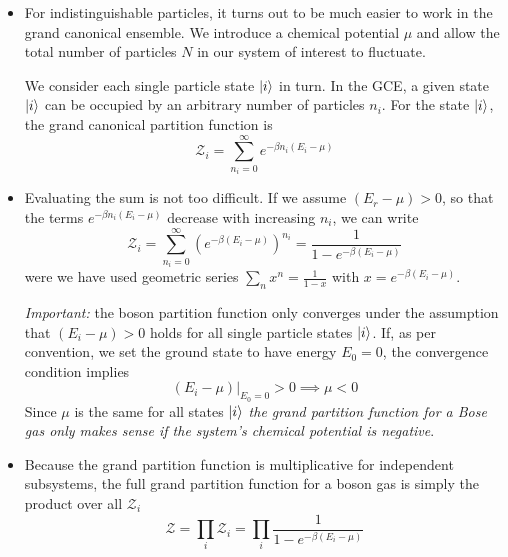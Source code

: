 \documentclass[11pt, a4paper]{article}
\begin{document}
\begin{itemize}
	\item For indistinguishable particles, it turns out to be much easier to work in the grand canonical ensemble. We introduce a chemical potential $ \mu $ and allow the total number of particles $ N $ in our system of interest to fluctuate.  
	
	We consider each single particle state $ \ket{i} $ in turn. In the GCE, a given state $ \ket{i} $ can be occupied by an arbitrary number of particles $ n_{i} $. For the state $ \ket{i} $, the grand canonical partition function is
	\begin{equation*}
		\mathcal{Z}_{i} = \sum_{n_{i}=0}^{\infty} e^{-\beta n_{i}(E_{i} - \mu)}
	\end{equation*}
	
	\item Evaluating the sum is not too difficult. If we assume $ (E_{r} - \mu) > 0 $, so that the terms $ e^{-\beta n_{i}(E_{i} - \mu)} $ decrease with increasing $ n_{i} $, we can write
	\begin{equation*}
		\mathcal{Z}_{i} = \sum_{n_{i}=0}^{\infty} \left(e^{-\beta (E_{i} - \mu)}\right)^{n_{i}} = \frac{1}{1 - e^{-\beta (E_{i} - \mu)}}
	\end{equation*}
	were we have used geometric series $ \sum_{n} x^{n} = \frac{1}{1 - x} $ with $ x = e^{-\beta (E_{i} - \mu)} $. 
	
	\textit{Important:} the boson partition function only converges under the assumption that $ (E_{i} - \mu) > 0 $ holds for all single particle states $ \ket{i} $. If, as per convention, we set the ground state to have energy $ E_{0} = 0 $, the convergence condition implies 
	\begin{equation*}
		(E_{i} - \mu)\big |_{E_{0} = 0} > 0 \implies \mu < 0 
	\end{equation*}
	Since $ \mu $ is the same for all states $ \ket{i} $ \textit{the grand partition function for a Bose gas only makes sense if the system's chemical potential is negative}.
	
	\item Because the grand partition function is multiplicative for independent subsystems, the full grand partition function for a boson gas is simply the product over all $ \mathcal{Z}_{i} $
	\begin{equation*}
		\mathcal{Z} = \prod_{i} \mathcal{Z}_{i} = \prod_{i} \frac{1}{1 - e^{-\beta (E_{i} - \mu)}}
	\end{equation*}
	

\end{itemize}
\end{document}
